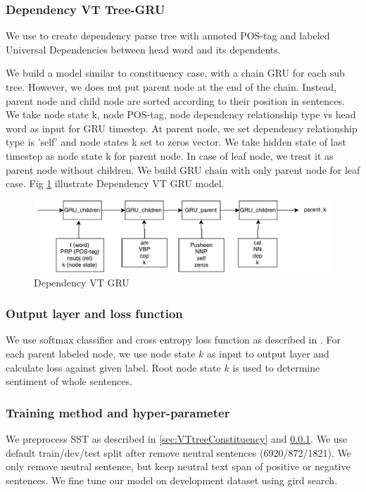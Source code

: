 \subsubsection{Dependency VT Tree-GRU} \label{sec:VTtreeDependency}
We use \cite{manning2014stanford} to create dependency parse tree with annoted POS-tag and labeled Universal Dependencies between head word and its dependents.

We build a model similar to constituency case, with a chain GRU for each sub tree. However, we does not put parent node at the end of the chain. Instead, parent node and child node are sorted according to their position in sentences. We take node state k, node POS-tag, node dependency relationship type vs head word as input for GRU timestep. At parent node, we set dependency relationship type is 'self' and node states k set to zeros vector. We take hidden state of last timestep as node state k for parent node. In case of leaf node, we treat it as parent node without children. We build GRU chain with only parent node for leaf case. Fig \ref{fig:dependencyvtgru} illustrate Dependency VT GRU model.

\begin{figure}[H]
	\centering
	\includegraphics[width=0.5\linewidth]{figure/dependencyvtgru}
	\caption[Dependency VT GRU]{Dependency VT GRU}
	\label{fig:dependencyvtgru}
\end{figure}

\subsubsection{Output layer and loss function}
We use softmax classifier and cross entropy loss function as described in \cite{treeLSTM}.  For each parent labeled node, we use node state $k$ as input to output layer and calculate loss against given label. Root node state $k$ is used to determine sentiment of whole sentences.

\subsubsection{Training method and hyper-parameter}
We preprocess SST as described in \ref{sec:VTtreeConstituency} and \ref{sec:VTtreeDependency}. We use default train/dev/test split after remove neutral sentences (6920/872/1821). We only remove neutral sentence, but keep neutral text span of positive or negative sentences. We fine tune our model on development dataset using gird search.


